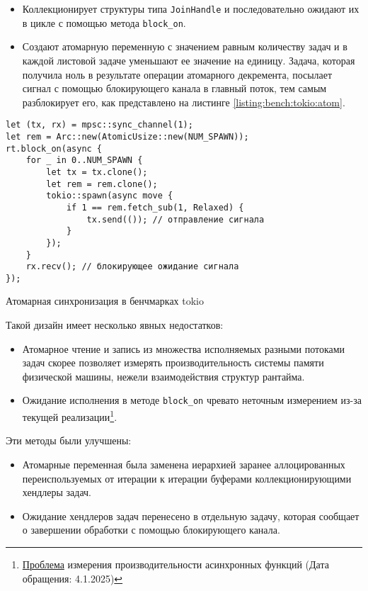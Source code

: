 \begin{itemize}
    \item Коллекционирует структуры типа \verb|JoinHandle| и последовательно ожидают их в цикле с помощью метода \verb|block_on|.
    \item Создают атомарную переменную с значением равным количеству задач и в каждой листовой задаче уменьшают ее значение на единицу. Задача, которая получила ноль в результате операции атомарного декремента, посылает сигнал с помощью блокирующего канала в главный поток, тем самым разблокирует его, как представлено на листинге \ref{listing:bench:tokio:atom}.
\end{itemize}

\begin{listing}[H]
    \begin{verbatim}
let (tx, rx) = mpsc::sync_channel(1);
let rem = Arc::new(AtomicUsize::new(NUM_SPAWN));
rt.block_on(async {
    for _ in 0..NUM_SPAWN {
        let tx = tx.clone();
        let rem = rem.clone();
        tokio::spawn(async move {
            if 1 == rem.fetch_sub(1, Relaxed) {
                tx.send(()); // отправление сигнала
            }
        });
    }
    rx.recv(); // блокирующее ожидание сигнала
});
    \end{verbatim}

    \caption{Атомарная синхронизация в бенчмарках tokio}
    \label{listing:bench:tokio:atom}
\end{listing}

Такой дизайн имеет несколько явных недостатков:

\begin{itemize}
    \item Атомарное чтение и запись из множества исполняемых разными потоками задач скорее позволяет измерять производительность системы памяти физической машины, нежели взаимодействия структур рантайма.
    \item Ожидание исполнения в методе \verb|block_on| чревато неточным измерением из-за текущей реализации\footnote{\href{https://github.com/bheisler/criterion.rs/issues/819}{Проблема} измерения производительности асинхронных функций (Дата обращения: 4.1.2025)}.
\end{itemize}

Эти методы были улучшены:

\begin{itemize}
    \item Атомарные переменная была заменена иерархией заранее аллоцированных переиспользуемых от итерации к итерации буферами коллекционирующими хендлеры задач.
    \item Ожидание хендлеров задач перенесено в отдельную задачу, которая сообщает о завершении обработки с помощью блокирующего канала.
\end{itemize}

